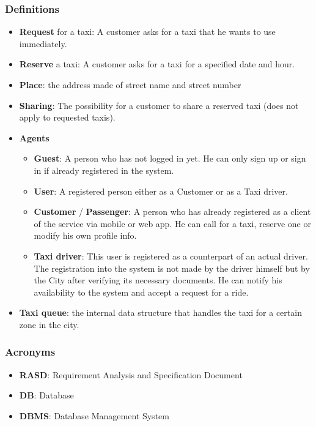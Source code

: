 \subsubsection{Definitions}
	\begin{itemize}
		\item \textbf{Request} for a taxi: A customer asks for a taxi that he wants to use immediately. 
		\item \textbf{Reserve} a taxi: A customer asks for a taxi for a specified date and hour.
		\item \textbf{Place}: the address made of street name and street number
		\item \textbf{Sharing}: The possibility for a customer to share a reserved taxi (does not apply to requested taxis).
		
		\item \textbf{Agents}
		\begin{itemize}
			\item \textbf{Guest}: A person who has not logged in yet. He can only sign up or sign in if already registered in the system.
			\item \textbf{User}: A registered person either as a Customer or as a Taxi driver.
			\item \textbf{Customer} / \textbf{Passenger}: A person who has already registered as a client of the service via mobile or web app. He can call for a taxi, reserve one or modify his own profile info.
			\item \textbf{Taxi driver}: This user is registered as a counterpart of an actual driver. The registration into the system is not made by the driver himself but by the City after verifying its necessary documents. He can notify his availability to the system and accept a request for a ride.
		\end{itemize}
		
		\item \textbf{Taxi queue}: the internal data structure that handles the taxi for a certain zone in the city.
	\end{itemize}
	
\subsubsection{Acronyms}
\begin{itemize}
	\item \textbf{RASD}: Requirement Analysis and Specification Document
	\item \textbf{DB}: Database
	\item \textbf{DBMS}: Database Management System
\end{itemize}

